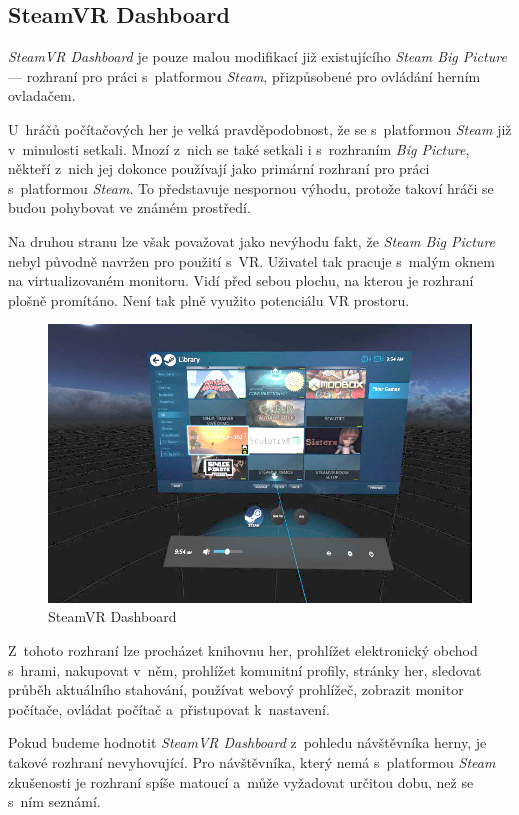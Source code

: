 \subsection{SteamVR Dashboard}\label{steamvr-dashboard}

\emph{SteamVR Dashboard} je pouze malou modifikací již existujícího
\emph{Steam Big Picture} --- rozhraní pro práci s~platformou
\emph{Steam}, přizpůsobené pro ovládání herním ovladačem.

U~hráčů počítačových her je velká pravděpodobnost, že se s~platformou
\emph{Steam} již v~minulosti setkali. Mnozí z~nich se také setkali i
s~rozhraním \emph{Big Picture}, někteří z~nich jej dokonce používají jako
primární rozhraní pro práci s~platformou \emph{Steam}. To představuje nespornou výhodu, protože takoví hráči se budou pohybovat ve
známém prostředí.

Na druhou stranu lze však považovat jako nevýhodu fakt, že \emph{Steam
Big Picture} nebyl původně navržen pro použití s~VR. Uživatel tak pracuje
s~malým oknem na virtualizovaném monitoru. Vidí před sebou plochu, na
kterou je rozhraní plošně promítáno. Není tak plně využito potenciálu VR
prostoru.

\begin{figure}[h!]
\centering
\includegraphics[width=12cm]{src/assets/steamvr-library.jpg}
\caption{SteamVR Dashboard \autocite{tomshardw}}
\end{figure}

Z~tohoto rozhraní lze procházet knihovnu her, prohlížet elektronický
obchod s~hrami, nakupovat v~něm, prohlížet komunitní profily, stránky
her, sledovat průběh aktuálního stahování, používat webový prohlížeč,
zobrazit monitor počítače, ovládat počítač a~přistupovat k~nastavení.

Pokud budeme hodnotit \emph{SteamVR Dashboard} z~pohledu návštěvníka
herny, je takové rozhraní nevyhovující. Pro návštěvníka, který nemá
s~platformou \emph{Steam} zkušenosti je rozhraní spíše matoucí a~může
vyžadovat určitou dobu, než se s~ním seznámí. 

